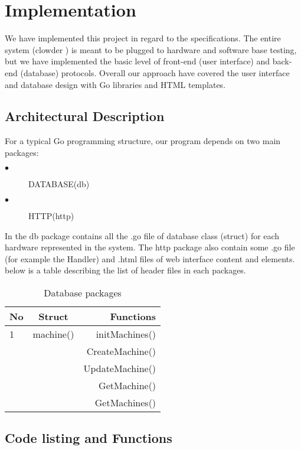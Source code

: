 \chapter{Implementation}
\label{chap:figtab}
We have implemented this project in regard to the specifications. The entire system (clowder ) is meant to be plugged to hardware and software base testing, but we have implemented the basic level of front-end (user interface) and back-end (database) protocols. Overall our approach have covered the user interface and database design with Go libraries and HTML templates.
\section{Architectural Description}
For a typical Go programming structure, our program depends on two main packages:
\begin{description}
\item[$\bullet$]DATABASE(db)
\item[$\bullet$]HTTP(http)
\end{description}
In the db package contains all the .go file of database class (struct) for each hardware represented in the system. The http package also contain some .go file (for example the Handler) and .html files of web interface content and elements. below is a table describing the list of header files in each packages.

\begin{table}[h!]
  \centering
  \caption{Database packages}
  \label{tab:table1}
  \begin{tabular}{l|c||r}
    No & Struct& Functions\\
    \hline
    1 &machine() &  initMachines()\\
      && CreateMachine()\\
      &&UpdateMachine()\\
      &&GetMachine()\\
      &&GetMachines()\\
  \end{tabular}
\end{table}
\section{Code listing and Functions}


